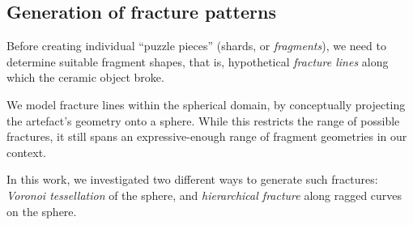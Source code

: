 \documentclass[acmlarge,screen,dvipsnames]{acmart}
\begin{document}
\subsection{Generation of fracture patterns}
\label{sec:fracture-patterns}

Before creating individual ``puzzle pieces'' (shards, or
\emph{fragments}), we need to determine suitable fragment shapes, that
is, hypothetical \emph{fracture lines} along which the ceramic object
broke.

We model fracture lines within the spherical domain, by conceptually
projecting the artefact's geometry onto a sphere. While this restricts
the range of possible fractures, it still spans an expressive-enough
range of fragment geometries in our context.

In this work, we investigated two different ways to generate such
fractures: \emph{Voronoi tessellation} of the sphere, and
\emph{hierarchical fracture} along ragged curves on the sphere.
\end{document}
